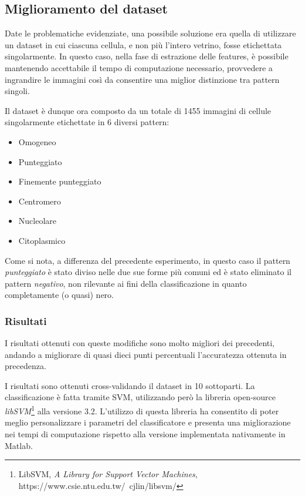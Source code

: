 \subsection{Miglioramento del dataset}

Date le problematiche evidenziate, una possibile soluzione era quella di utilizzare un dataset in cui ciascuna cellula, e non più l'intero vetrino, fosse etichettata singolarmente. 
In questo caso, nella fase di estrazione delle features, è possibile mantenendo accettabile il tempo di computazione necessario, provvedere a ingrandire le immagini così da consentire una miglior distinzione tra pattern singoli.

Il dataset è dunque ora composto da un totale di 1455 immagini di cellule singolarmente etichettate in 6 diversi pattern:
\begin{itemize}
\item Omogeneo
\item Punteggiato
\item Finemente punteggiato
\item Centromero
\item Nucleolare
\item Citoplasmico
\end{itemize}

Come si nota, a differenza del precedente esperimento, in questo caso il pattern \emph{punteggiato} è stato diviso nelle due sue forme più comuni ed è stato eliminato il pattern \emph{negativo}, non rilevante ai fini della classificazione in quanto completamente (o quasi) nero.

\subsubsection{Risultati}

I risultati ottenuti con queste modifiche sono molto migliori dei precedenti, andando a migliorare di quasi dieci punti percentuali l'accuratezza ottenuta in precedenza.

I risultati sono ottenuti cross-validando il dataset in 10 sottoparti. La classificazione è fatta tramite SVM, utilizzando però la libreria open-source \emph{libSVM}\footnote{LibSVM, \emph{A Library for Support Vector Machines}, https://www.csie.ntu.edu.tw/~cjlin/libsvm/} alla versione 3.2. L'utilizzo di questa libreria ha consentito di poter meglio personalizzare i parametri del classificatore e presenta una migliorazione nei tempi di computazione rispetto alla versione implementata nativamente in Matlab.

